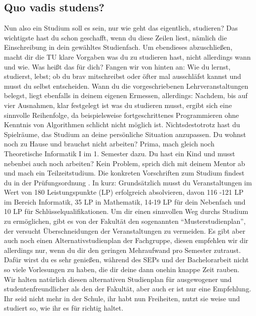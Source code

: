 \subsection{Quo vadis studens?}

Nun also ein Studium soll es sein, nur wie geht das eigentlich, studieren?
Das wichtigste hast du schon geschafft, wenn du diese Zeilen liest, nämlich die Einschreibung in dein gewähltes Studienfach. 
Um ebendieses abzuschließen, macht dir die TU klare Vorgaben was du zu studieren hast, nicht allerdings wann und wie. Was heißt das für dich?
Fangen wir von hinten an: 
Wie du lernst, studierst, lebst; ob du brav mitschreibst oder öfter mal ausschläfst kannst und musst du selbst entscheiden.
Wann du die vorgeschriebenen Lehrveranstaltungen belegst, liegt ebenfalls in deinem eigenen Ermessen, allerdings:
Nachdem, bis auf vier Ausnahmen, klar festgelegt ist was du studieren musst, ergibt sich eine sinnvolle Reihenfolge, da beispielsweise fortgeschrittenes Programmieren ohne Kenntnis von Algorithmen schlicht nicht möglich ist. Nichtsdestotrotz hast du Spielräume, das Studium an deine persönliche Situation anzupassen.    
Du wohnst noch zu Hause und brauchst nicht arbeiten? Prima, mach gleich noch Theoretische Informatik I im 1. Semester dazu.
Du hast ein Kind und musst nebenbei auch noch arbeiten? Kein Problem, sprich dich mit deinem Mentor ab und mach ein Teilzeitstudium.
Die konkreten Vorschriften zum Studium findest du in der Prüfungsordnung 
.
In kurz: Grundsätzlich musst du Veranstaltungen im Wert von 180 Leistungspunkte (LP) erfolgreich absolvieren, davon 116 -121 LP im Bereich Informatik, 35 LP in Mathematik, 14-19 LP für dein Nebenfach und 10 LP für Schlüsselqualifikationen.
Um dir einen sinnvollen Weg durchs Studium zu ermöglichen, gibt es von der Fakultät den sogenannten “Musterstudienplan”, der versucht Überschneidungen der Veranstaltungen zu vermeiden. 
Es gibt aber auch noch einen Alternativstudienplan der Fachgruppe, diesen empfehlen wir dir allerdings nur, wenn du dir den geringen Mehraufwand pro Semester zutraust. Dafür wirst du es sehr genießen, während des SEPs und der Bachelorarbeit nicht so viele Vorlesungen zu haben, die dir deine dann onehin knappe Zeit rauben.
Wir halten natürlich diesen alternativen Studienplan für ausgewogener und
studentenfreundlicher als den der Fakultät, aber auch er ist nur eine Empfehlung. 
Ihr seid nicht mehr in der Schule, ihr habt nun Freiheiten, nutzt sie weise und studiert so, wie ihr es für richtig haltet.



